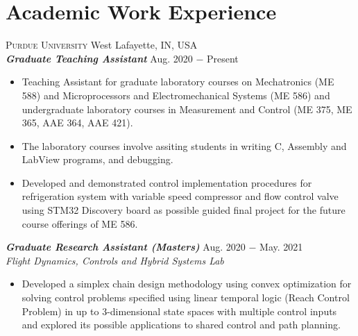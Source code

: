 \documentclass[letterpaper,10pt]{article}
\begin{document}
\section{Academic Work Experience}
\noindent \textsc{Purdue University} \hfill West Lafayette, IN, USA \\
\vspace{3pt}
\noindent \textbf{\textit{Graduate Teaching Assistant}} \hfill Aug. 2020 $-$ Present\\
\begin{itemize}[noitemsep,nolistsep,leftmargin=0.25in,label={--}]
\item Teaching Assistant for graduate laboratory courses on Mechatronics (ME 588) and Microprocessors and Electromechanical Systems (ME
586) and undergraduate laboratory courses in Measurement and Control (ME 375, ME 365, AAE 364, AAE 421).
\item The laboratory courses involve assiting students in writing C, Assembly and LabView programs, and debugging.
\item Developed and demonstrated control implementation procedures for refrigeration system with variable speed compressor and flow control valve using STM32 Discovery board as possible guided final project for the future course offerings of ME 586.
\end{itemize}
\vspace{3pt}
\noindent \textbf{\textit{Graduate Research Assistant (Masters)}} \hfill Aug. 2020 $-$ May. 2021\\
\textit{Flight Dynamics, Controls and Hybrid Systems Lab}
\begin{itemize}[noitemsep,nolistsep,leftmargin=0.25in,label={--}]
	\item Developed a simplex chain design methodology using convex optimization for solving control problems specified using linear temporal logic (Reach Control Problem) in up to 3-dimensional state spaces with multiple control inputs and explored its possible applications to shared control and path planning.
\end{itemize}



\end{document}
